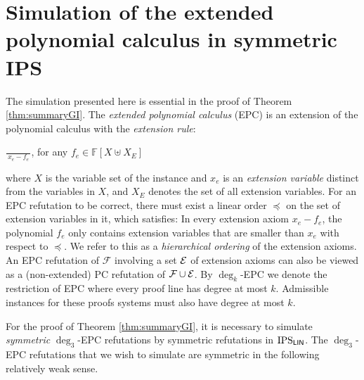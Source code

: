 \documentclass[10pt,a4paper]{article}
\newcommand{\Ee}{{\cal E}}
\newcommand{\Field}{\ensuremath{\mathbb{F}}}
\newcommand{\F}{\ensuremath{\mathcal{F}}}
\newcommand{\IPSlin}{\text{\upshape IPS}_{\mathsf{LIN}}}
\begin{document}
\section{Simulation of the extended polynomial calculus in symmetric IPS}
The simulation presented here is essential in the proof of Theorem \ref{thm:summaryGI}.
The \textit{extended polynomial calculus} (EPC) is an extension of the polynomial calculus with
the \textit{extension rule}:
\begin{center}
	{\Large$\frac{}{~  x_e - f_e ~}$},
	for any $f_e\in \Field[X \uplus X_E]$
\end{center}
where $X$ is the variable set of the instance and $x_e$ is an
\textit{extension variable} distinct from the variables in $X$, and $X_E$ denotes the set of all extension variables. For an EPC refutation to be correct, there must exist a linear order $\preceq$ on the set of extension variables in it, which satisfies: In every extension axiom $x_e - f_e$, the polynomial $f_e$ only contains extension variables that are smaller than $x_e$ with respect to $\preceq$. We refer to this as a \emph{hierarchical ordering} of the extension axioms. An EPC refutation of $\F$ involving a set $\Ee$ of extension axioms can also be viewed as a (non-extended) PC refutation of $\F \cup \Ee$. By $\deg_k$-EPC we denote the restriction of EPC where every proof line has degree at most $k$. Admissible instances for these proofs systems must also have degree at most $k$.

For the proof of Theorem \ref{thm:summaryGI}, it is necessary to simulate \emph{symmetric} $\deg_3$-EPC refutations by symmetric refutations in $\IPSlin$. The $\deg_3$-EPC refutations that we wish to simulate are symmetric in the following relatively weak sense.
\end{document}
